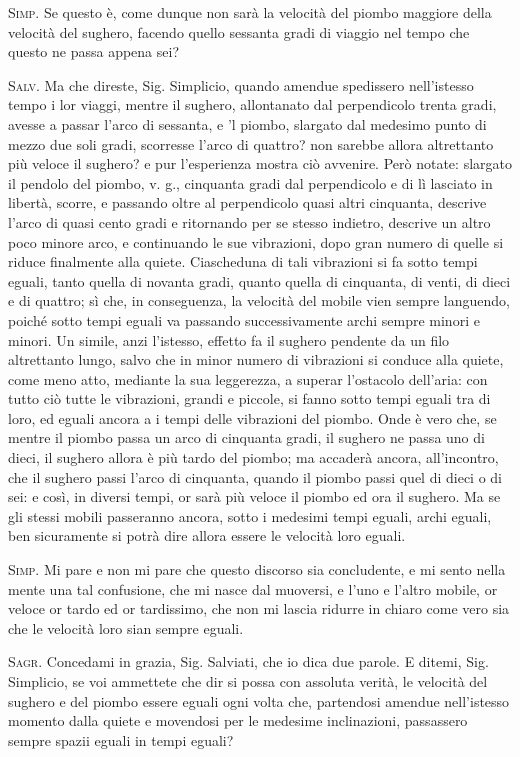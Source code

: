\documentclass[11pt,twoside,openany]{book}
\newcommand{\speaker}[1]{\textcolor{rubric}{\textsc{#1}}\space}
\begin{document}
\speaker{Simp.} Se questo è, come dunque non sarà la velocità del piombo maggiore della velocità del sughero, facendo quello sessanta gradi di viaggio nel tempo che questo ne passa appena sei?

\speaker{Salv.} Ma che direste, Sig. Simplicio, quando amendue spedissero nell'istesso tempo i lor viaggi, mentre il sughero, allontanato dal perpendicolo trenta gradi, avesse a passar l'arco di sessanta, e 'l piombo, slargato dal medesimo punto di mezzo due soli gradi, scorresse l'arco di quattro? non sarebbe allora altrettanto più veloce il sughero? e pur l'esperienza mostra ciò avvenire. Però notate: slargato il pendolo del piombo, v. g., cinquanta gradi dal perpendicolo e di lì lasciato in libertà, scorre, e passando oltre al perpendicolo quasi altri cinquanta, descrive l'arco di quasi cento gradi e ritornando per se stesso indietro, descrive un altro poco minore arco, e continuando le sue vibrazioni, dopo gran numero di quelle si riduce finalmente alla quiete. Ciascheduna di tali vibrazioni si fa sotto tempi eguali, tanto quella di novanta gradi, quanto quella di cinquanta, di venti, di dieci e di quattro; sì che, in conseguenza, la velocità del mobile vien sempre languendo, poiché sotto tempi eguali va passando successivamente archi sempre minori e minori. Un simile, anzi l'istesso, effetto fa il sughero pendente da un filo altrettanto lungo, salvo che in minor numero di vibrazioni si conduce alla quiete, come meno atto, mediante la sua leggerezza, a superar l'ostacolo dell'aria: con tutto ciò tutte le vibrazioni, grandi e piccole, si fanno sotto tempi eguali tra di loro, ed eguali ancora a i tempi delle vibrazioni del piombo. Onde è vero che, se mentre il piombo passa un arco di cinquanta gradi, il sughero ne passa uno di dieci, il sughero allora è più tardo del piombo; ma accaderà ancora, all'incontro, che il sughero passi l'arco di cinquanta, quando il piombo passi quel di dieci o di sei: e così, in diversi tempi, or sarà più veloce il piombo ed ora il sughero. Ma se gli stessi mobili passeranno ancora, sotto i medesimi tempi eguali, archi eguali, ben sicuramente si potrà dire allora essere le velocità loro eguali.

\speaker{Simp.} Mi pare e non mi pare che questo discorso sia concludente, e mi sento nella mente una tal confusione, che mi nasce dal muoversi, e l'uno e l'altro mobile, or veloce or tardo ed or tardissimo, che non mi lascia ridurre in chiaro come vero sia che le velocità loro sian sempre eguali.

\speaker{Sagr.} Concedami in grazia, Sig. Salviati, che io dica due parole. E ditemi, Sig. Simplicio, se voi ammettete che dir si possa con assoluta verità, le velocità del sughero e del piombo essere eguali ogni volta che, partendosi amendue nell'istesso momento dalla quiete e movendosi per le medesime inclinazioni, passassero sempre spazii eguali in tempi eguali?
\end{document}
